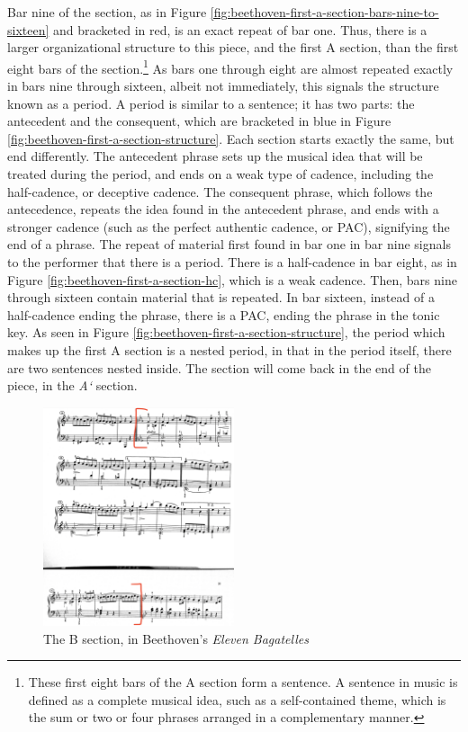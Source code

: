Bar nine of the section, as in Figure \ref{fig:beethoven-first-a-section-bars-nine-to-sixteen}\autocite{Henle_1978} and bracketed in red, is an exact repeat of bar one. Thus, there is a larger organizational structure to this piece, and the first A section, than the first eight bars of the section.\footnote{These first eight bars of the A section form a sentence. A sentence in music is defined as a complete musical idea, such as a self-contained theme, which is the sum or two or four phrases arranged in a complementary manner.} As bars one through eight are almost repeated exactly in bars nine through sixteen, albeit not immediately, this signals the structure known as a period. A period is similar to a sentence; it has two parts: the antecedent and the consequent, which are bracketed in blue in Figure \ref{fig:beethoven-first-a-section-structure}\autocite{Henle_1978}. Each section starts exactly the same, but end differently. The antecedent phrase sets up the musical idea that will be treated during the period, and ends on a weak type of cadence, including the half-cadence, or deceptive cadence. The consequent phrase, which follows the antecedence, repeats the idea found in the antecedent phrase, and ends with a stronger cadence (such as the perfect authentic cadence, or PAC), signifying the end of a phrase. The repeat of material first found in bar one in bar nine signals to the performer that there is a period. There is a half-cadence in bar eight, as in Figure \ref{fig:beethoven-first-a-section-hc}\autocite{Henle_1978}, which is a weak cadence. Then, bars nine through sixteen contain material that is repeated. In bar sixteen, instead of a half-cadence ending the phrase, there is a PAC, ending the phrase in the tonic key. As seen in Figure \ref{fig:beethoven-first-a-section-structure}\autocite{Henle_1978}, the period which makes up the first A section is a nested period, in that in the period itself, there are two sentences nested inside. The section will come back in the end of the piece, in the \textit{A`} section. 

\begin{figure}
	\centering
	\includegraphics[width=0.5\textwidth]{figures/beethoven-b-section.jpg}
	\caption{The B section, in Beethoven's \textit{Eleven Bagatelles}}
	\label{fig:beethoven-b-section}
\end{figure}

